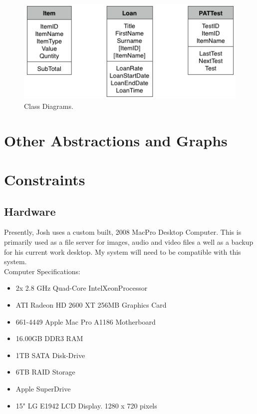 \documentclass[a4paper,12pt]{report}
\begin{document}
\begin{figure}[H]
    \caption{Class Diagrams.} \label{fig:relationship_diagram}
    \centerline{\includegraphics[width=\textwidth]{./Class_Definitions/Class_diagrams.pdf}}
\end{figure}

\newpage

\section{Other Abstractions and Graphs}

\section{Constraints}

\subsection{Hardware}

Presently, Josh uses a custom built, 2008 MacPro Desktop Computer. This is primarily used as a file server for images, audio and video files a well as a backup for his current work desktop. My system will need to be compatible with this system.\\

\noindent Computer Specifications:
\begin{itemize}
    \item 2x 2.8 GHz Quad-Core Intel\textregistered Xeon\texttrademark Processor
    \item ATI Radeon HD 2600 XT 256MB Graphics Card
    \item 661-4449 Apple Mac Pro A1186 Motherboard
    \item 16.00GB DDR3 RAM
    \item 1TB SATA Disk-Drive
    \item 6TB RAID Storage
    \item Apple SuperDrive
    \item 15" LG E1942 LCD Display. 1280 x 720 pixels
\end{itemize}
\end{document}
